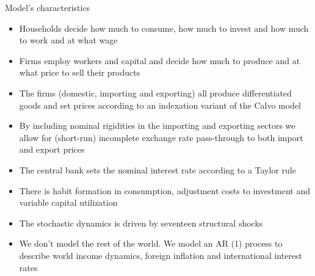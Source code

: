 \documentclass[9pt]{beamer}
\begin{document}
\begin{frame}{Model’s characteristics}
\begin{itemize}
    \item Households decide how much to consume, how much to invest and
    how much to work and at what wage
    
    \item Firms employ workers and capital and decide how much to produce
    and at what price to sell their products
    
    \item The firms (domestic, importing and exporting) all produce differentiated goods and set prices according to an indexation variant of the Calvo model
    
    \item By including nominal rigidities in the importing and exporting sectors we allow for (short-run) incomplete exchange rate pass-through to both import and export prices
    
    
    \item The central bank sets the nominal interest rate according to a Taylor rule
    
    \item There is habit formation in consumption, adjustment costs to
    investment and variable capital utilization
    
    \item The stochastic dynamics is driven by seventeen structural shocks
    
    \item  We don't model the rest of the world. We model an AR (1) process to describe world income dynamics, foreign inflation and international interest rates
    
\end{itemize}


\end{frame}
\end{document}
